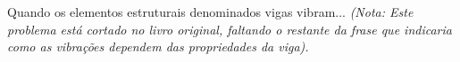 Quando os elementos estruturais denominados vigas vibram... \textit{(Nota: Este problema está cortado no livro original, faltando o restante da frase que indicaria como as vibrações dependem das propriedades da viga).}

